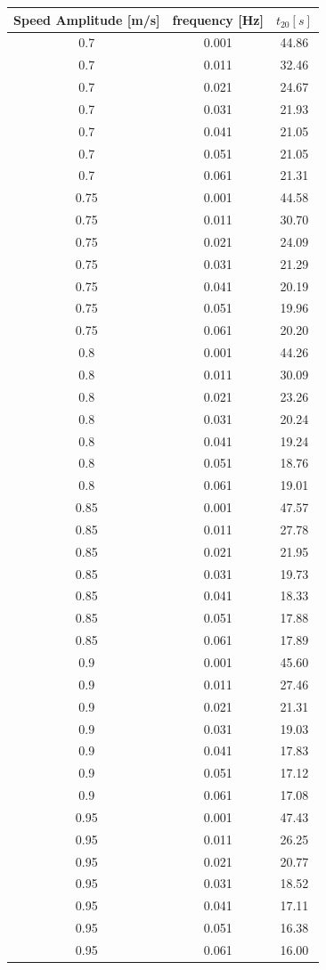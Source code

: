  \begin{table}[H] 
 \centering 
 \begin{tabular}{|c|c|c|}
 \hline
 Speed Amplitude [m/s] & frequency [Hz] & $t_{20} [s]$ \\ \hline

 0.7 & 0.001 & 44.86 \\ \hline
0.7 & 0.011 & 32.46 \\ \hline
0.7 & 0.021 & 24.67 \\ \hline
0.7 & 0.031 & 21.93 \\ \hline
0.7 & 0.041 & 21.05 \\ \hline
0.7 & 0.051 & 21.05 \\ \hline
0.7 & 0.061 & 21.31 \\ \hline
0.75 & 0.001 & 44.58 \\ \hline
0.75 & 0.011 & 30.70 \\ \hline
0.75 & 0.021 & 24.09 \\ \hline
0.75 & 0.031 & 21.29 \\ \hline
0.75 & 0.041 & 20.19 \\ \hline
0.75 & 0.051 & 19.96 \\ \hline
0.75 & 0.061 & 20.20 \\ \hline
0.8 & 0.001 & 44.26 \\ \hline
0.8 & 0.011 & 30.09 \\ \hline
0.8 & 0.021 & 23.26 \\ \hline
0.8 & 0.031 & 20.24 \\ \hline
0.8 & 0.041 & 19.24 \\ \hline
0.8 & 0.051 & 18.76 \\ \hline
0.8 & 0.061 & 19.01 \\ \hline
0.85 & 0.001 & 47.57 \\ \hline
0.85 & 0.011 & 27.78 \\ \hline
0.85 & 0.021 & 21.95 \\ \hline
0.85 & 0.031 & 19.73 \\ \hline
0.85 & 0.041 & 18.33 \\ \hline
0.85 & 0.051 & 17.88 \\ \hline
0.85 & 0.061 & 17.89 \\ \hline
0.9 & 0.001 & 45.60 \\ \hline
0.9 & 0.011 & 27.46 \\ \hline
0.9 & 0.021 & 21.31 \\ \hline
0.9 & 0.031 & 19.03 \\ \hline
0.9 & 0.041 & 17.83 \\ \hline
0.9 & 0.051 & 17.12 \\ \hline
0.9 & 0.061 & 17.08 \\ \hline
0.95 & 0.001 & 47.43 \\ \hline
0.95 & 0.011 & 26.25 \\ \hline
0.95 & 0.021 & 20.77 \\ \hline
0.95 & 0.031 & 18.52 \\ \hline
0.95 & 0.041 & 17.11 \\ \hline
0.95 & 0.051 & 16.38 \\ \hline
0.95 & 0.061 & 16.00 \\ \hline




\end{tabular}
\end{table}
